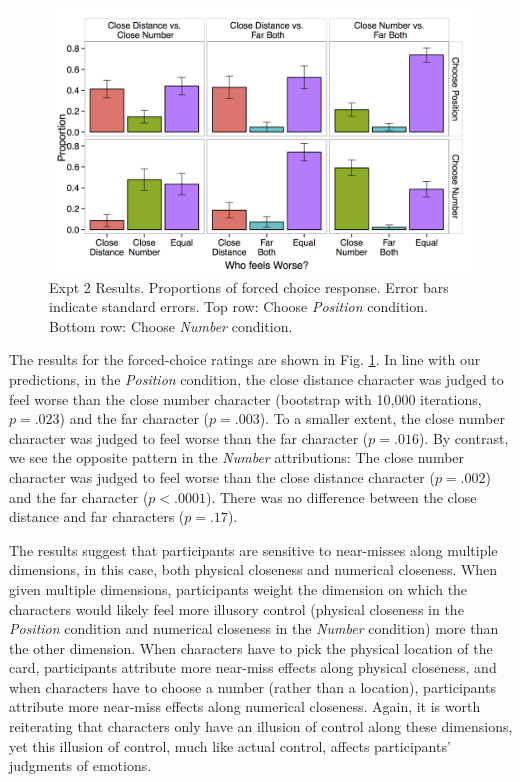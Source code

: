 \documentclass[10pt,letterpaper]{article}
\begin{document}
\begin{figure}[htb!]
\includegraphics[width=\columnwidth]{images/cardCombined_forcedWorse.png}
\caption{ Expt 2 Results. Proportions of forced choice response. Error bars indicate standard errors. Top row: Choose \textit{Position} condition. Bottom row: Choose \textit{Number} condition.}
\label{Expt2ResultFig}
\end{figure}


The results for the forced-choice ratings are shown in Fig. \ref{Expt2ResultFig}. In line with our predictions, in the \textit{Position} condition, the close distance character was judged to feel worse than the close number character (bootstrap with 10,000 iterations, $p=.023$) and the far character ($p=.003$). To a smaller extent, the close number character was judged to feel worse than the far character ($p=.016$). By contrast, we see the opposite pattern in the \textit{Number} attributions: The close number character was judged to feel worse than the close distance character ($p=.002$) and the far character ($p<.0001$). There was no difference between the close distance and far characters ($p=.17$). 


The results suggest that participants are sensitive to near-misses along multiple dimensions, in this case, both physical closeness and numerical closeness. When given multiple dimensions, participants weight the dimension on which the characters would likely feel more illusory control (physical closeness in the \textit{Position} condition and numerical closeness in the \textit{Number} condition) more than the other dimension. When characters have to pick the physical location of the card, participants attribute more near-miss effects along physical closeness, and when characters have to choose a number (rather than a location), participants attribute more near-miss effects along numerical closeness. Again, it is worth reiterating that characters only have an illusion of control along these dimensions, yet this illusion of control, much like actual control, affects participants' judgments of emotions.
\end{document}
